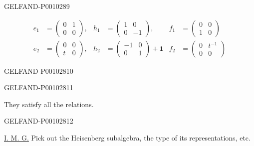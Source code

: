 \begin{GelfandAdjacentEvidence}{GELFAND-P001028}{9}

\begin{equation*}
\begin{aligned}
e_1&=\begin{pmatrix}0&1\\0&0\end{pmatrix},&
h_1&=\begin{pmatrix}1&0\\0&-1\end{pmatrix},&
f_1&=\begin{pmatrix}0&0\\1&0\end{pmatrix}\\
e_2&=\begin{pmatrix}0&0\\t&0\end{pmatrix},&
h_2&=\begin{pmatrix}-1&0\\0&1\end{pmatrix}+\mathbf1&
f_2&=\begin{pmatrix}0&t^{-1}\\0&0\end{pmatrix}
\end{aligned}
\tag{2}
\end{equation*}
\end{GelfandAdjacentEvidence}
\begin{GelfandAdjacentEvidence}{GELFAND-P001028}{10}

\end{GelfandAdjacentEvidence}
\begin{GelfandAdjacentEvidence}{GELFAND-P001028}{11}


They satisfy all the relations.
\end{GelfandAdjacentEvidence}
\begin{GelfandAdjacentEvidence}{GELFAND-P001028}{12}


\underline{I. M. G.} Pick out the Heisenberg subalgebra, the type of its representations, etc.
\end{GelfandAdjacentEvidence}
